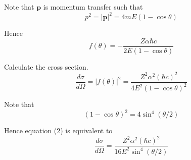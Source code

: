 Note that $\mathbf p$ is momentum transfer such that
\begin{equation*}
p^2=|\mathbf p|^2=4mE(1-\cos\theta)
\end{equation*}

Hence
\begin{equation*}
f(\theta)=-\frac{Z\alpha\hbar c}{2E(1-\cos\theta)}
\end{equation*}

Calculate the cross section.
\begin{equation*}
\frac{d\sigma}{d\Omega}=|f(\theta)|^2
=\frac{Z^2\alpha^2(\hbar c)^2}{4E^2(1-\cos\theta)^2}
\tag{2}
\end{equation*}

Note that
\begin{equation*}
(1-\cos\theta)^2=4\sin^4(\theta/2)
\end{equation*}

Hence equation (2) is equivalent to
\begin{equation*}
\frac{d\sigma}{d\Omega}=\frac{Z^2\alpha^2(\hbar c)^2}{16E^2\sin^4(\theta/2)}
\tag{3}
\end{equation*}



